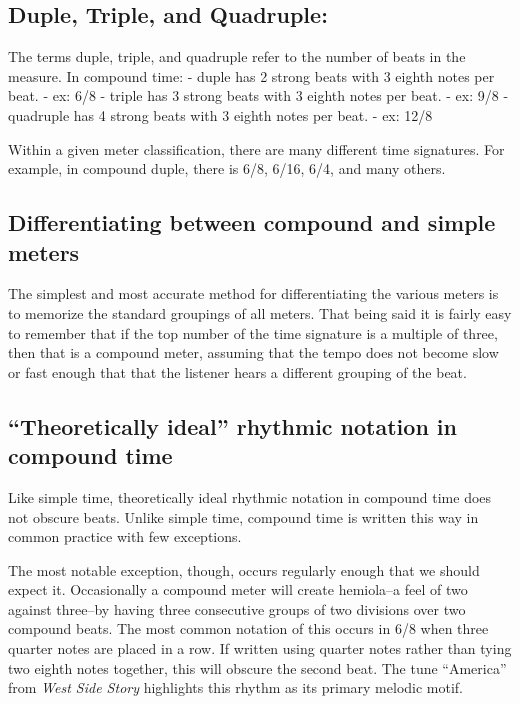\documentclass{book}
\begin{document}
\hypertarget{duple-triple-and-quadruple-1}{%
\subsection{Duple, Triple, and
Quadruple:}\label{duple-triple-and-quadruple-1}}

The terms duple, triple, and quadruple refer to the number of beats in the
measure. In compound time: - duple has 2 strong beats with 3 eighth notes per
beat. - ex: 6/8 - triple has 3 strong beats with 3 eighth notes per beat. -
ex: 9/8 - quadruple has 4 strong beats with 3 eighth notes per beat. - ex:
12/8

Within a given meter classification, there are many different time signatures.
For example, in compound duple, there is 6/8, 6/16, 6/4, and many others.

\hypertarget{differentiating-between-compound-and-simple-meters}{%
\subsection{Differentiating between compound and simple
meters}\label{differentiating-between-compound-and-simple-meters}}

The simplest and most accurate method for differentiating the various meters
is to memorize the standard groupings of all meters. That being said it is
fairly easy to remember that if the top number of the time signature is a
multiple of three, then that is a compound meter, assuming that the tempo does
not become slow or fast enough that that the listener hears a different
grouping of the beat.

\hypertarget{theoretically-ideal-rhythmic-notation-in-compound-time}{%
\subsection{``Theoretically ideal'' rhythmic notation in compound
time}\label{theoretically-ideal-rhythmic-notation-in-compound-time}}

Like simple time, theoretically ideal rhythmic notation in compound time does
not obscure beats. Unlike simple time, compound time is written this way in
common practice with few exceptions.

The most notable exception, though, occurs regularly enough that we should
expect it. Occasionally a compound meter will create hemiola--a feel of two
against three--by having three consecutive groups of two divisions over two
compound beats. The most common notation of this occurs in 6/8 when three
quarter notes are placed in a row. If written using quarter notes rather than
tying two eighth notes together, this will obscure the second beat. The tune
``America'' from \emph{West Side Story} highlights this rhythm as its primary
melodic motif.
\end{document}
